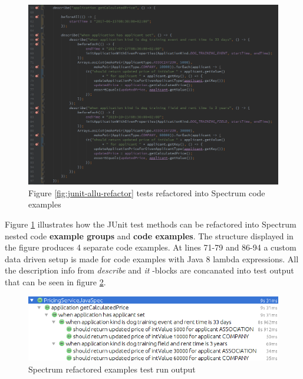     \begin{figure}[H]
      \begin{center}
        \includegraphics[width=14.7cm]{images/spectrum-pricing-examples.png}
        \caption{Figure \ref{fig:junit-allu-refactor} tests refactored into Spectrum code examples}
        \label{fig:spectrum-allu-refactor}
      \end{center}
    \end{figure}

    Figure \ref{fig:spectrum-allu-refactor} illustrates how the JUnit test methods can be refactored into Spectrum
    nested code \textbf{example groups} and \textbf{code examples}. The structure displayed in the figure produces 4 separate
    code examples. At lines 71-79 and 86-94 a custom data driven setup is made for code examples with Java 8 lambda expressions.
    All the description info from \textit{describe} and \textit{it} -blocks are concanated into test output
    that can be seen in figure \ref{fig:spectrum-allu-refactor-output}.

    \begin{figure}[H]
      \begin{center}
        \includegraphics[width=14.7cm]{images/spectrum-pricing-results.png}
        \caption{Spectrum refactored examples test run output}
        \label{fig:spectrum-allu-refactor-output}
      \end{center}
    \end{figure}


